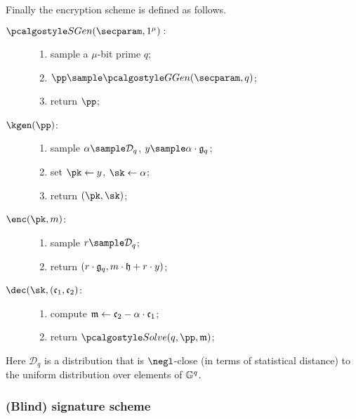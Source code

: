 \documentclass[runningheads,10pt]{llncs}
\numberwithin{equation}{section}
\begin{document}
  Finally the encryption scheme is defined as follows. 
  \begin{description}
  \item[$\sgen (\secparam, 1^\mu):$]
    \begin{enumerate}
    \item sample a $\mu$-bit prime $q$;
    \item $\pp \sample \ggen (\secparam, q)$; 
    \item return $\pp$;
    \end{enumerate}
  \item[$\kgen (\pp)$:]
    \begin{enumerate}
    \item sample $\alpha \sample \mathcal{D}_q$, $y \sample \alpha \cdot \ggenerator_q$;
    \item set $\pk \gets y$, $\sk \gets \alpha$;
    \item return $(\pk, \sk)$;
    \end{enumerate}
  \item[$\enc (\pk, m)$:]
    \begin{enumerate}
    \item sample $r \sample \mathcal{D}_q$;
    \item return $(r \cdot \mathfrak{g}_q, m \cdot \mathfrak{h} + r \cdot y)$;
    \end{enumerate}
  \item[$\dec (\sk, (\grpelement{c}_1, \grpelement{c}_2)$:]
    \begin{enumerate}
    \item compute $\mathfrak{m} \gets \mathfrak{c}_2 - \alpha \cdot \mathfrak{c}_1$;
    \item return $\solve(q, \pp, \grpelement{m})$;
    \end{enumerate}
  \end{description}

  Here $\mathcal{D}_q$ is a distribution that is $\negl$-close (in terms of
  statistical distance) to the uniform distribution over elements of $\mathbb{G}^q$.

\subsubsection{(Blind) signature scheme}
\end{document}
